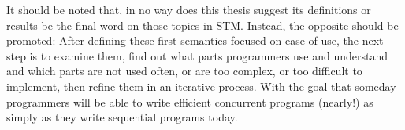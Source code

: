 It should be noted that, in no way does this thesis suggest its definitions or results be the final
word on those topics in STM.
Instead, the opposite should be promoted:
After defining these first semantics focused on ease of use, the next step is to examine them,
find out what parts programmers use and understand and which parts are not used often, or
are too complex, or too difficult to implement, then refine them in an iterative process.
With the goal that someday programmers will be able to write efficient concurrent programs
(nearly!) as simply as they write sequential programs today.